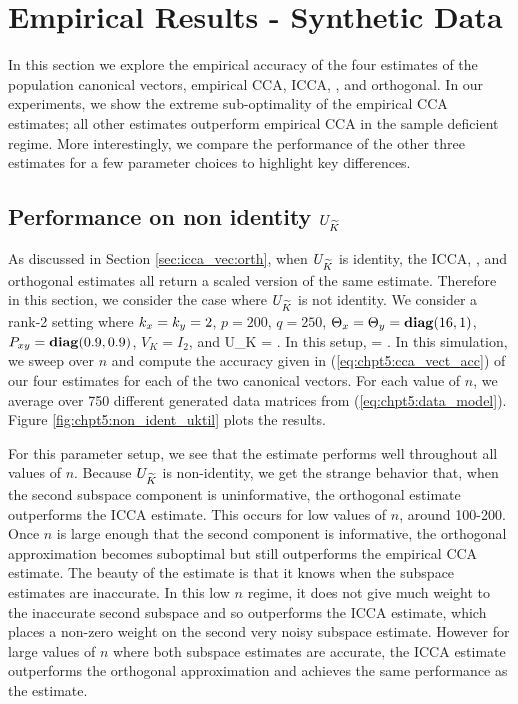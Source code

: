 \section{Empirical Results - Synthetic Data}

In this section we explore the empirical accuracy of the four estimates of the population
canonical vectors, empirical CCA, ICCA, \iccaps, and orthogonal. In our experiments, we
show the extreme sub-optimality of the empirical CCA estimates; all other estimates
outperform empirical CCA in the sample deficient regime. More interestingly, we compare the
performance of the other three estimates for a few parameter choices to highlight key
differences.

\subsection{Performance on non identity $U_{\widetilde{K}}$}

As discussed in Section \ref{sec:icca_vec:orth}, when $U_{\widetilde{K}}$ is identity, the ICCA,
\iccaps, and orthogonal estimates all return a scaled version of the same
estimate. Therefore in this section, we consider the case where $U_{\widetilde{K}}$ is not
identity. We consider a rank-2 setting where $k_x=k_y=2$, $p=200$, $q=250$,
$\Theta_x=\Theta_y=\mathop{\bf diag}(16,1)$, $P_{xy}=\mathop{\bf diag}(0.9,0.9)$, 
$V_K=I_2$, and
\be
U_K = \left[\begin{array}{cc} 1 & -2 \\ 2 & 1\end{array}\right].
\ee
In this setup,
\be
\Uktil = \left[\begin{array}{cc} -0.8559 & -0.5172 \\ -0.5172 & 0.8559\end{array}\right].
\ee
In this simulation, we sweep over $n$ and compute the accuracy given in
(\ref{eq:chpt5:cca_vect_acc}) of our four estimates for each of the two canonical
vectors. For each value of $n$, we average over 750 different generated data matrices from
(\ref{eq:chpt5:data_model}). Figure \ref{fig:chpt5:non_ident_uktil} plots the results.

For this parameter setup, we see that the \iccap estimate performs well throughout all
values of $n$. Because $U_{\widetilde{K}}$ is non-identity, we get the strange behavior that, when
the second subspace component is uninformative, the orthogonal estimate outperforms the
ICCA estimate. This occurs for low values of $n$, around 100-200. Once $n$ is large enough
that the second component is informative, the orthogonal approximation becomes suboptimal
but still outperforms the empirical CCA estimate. The beauty of the \iccap estimate is
that it knows when the subspace estimates are inaccurate. In this low $n$ regime, it does
not give much weight to the inaccurate second subspace and so outperforms the ICCA
estimate, which places a non-zero weight on the second very noisy subspace
estimate. However for large values of $n$ where both subspace estimates are accurate, the
ICCA estimate outperforms the orthogonal approximation and achieves the same
performance as the \iccap estimate.

